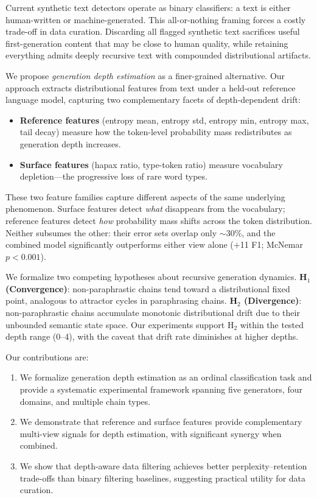 \documentclass[letterpaper,11pt]{article}
\begin{document}
Current synthetic text detectors operate as binary classifiers: a text is either human-written or machine-generated. This all-or-nothing framing forces a costly trade-off in data curation. Discarding all flagged synthetic text sacrifices useful first-generation content that may be close to human quality, while retaining everything admits deeply recursive text with compounded distributional artifacts.

We propose \emph{generation depth estimation} as a finer-grained alternative. Our approach extracts distributional features from text under a held-out reference language model, capturing two complementary facets of depth-dependent drift:
\begin{itemize}
    \item \textbf{Reference features} (entropy mean, entropy std, entropy min, entropy max, tail decay) measure how the token-level probability mass redistributes as generation depth increases.
    \item \textbf{Surface features} (hapax ratio, type-token ratio) measure vocabulary depletion---the progressive loss of rare word types.
\end{itemize}
These two feature families capture different aspects of the same underlying phenomenon. Surface features detect \emph{what} disappears from the vocabulary; reference features detect \emph{how} probability mass shifts across the token distribution. Neither subsumes the other: their error sets overlap only $\sim$30\%, and the combined model significantly outperforms either view alone ($+$11 F1; McNemar $p < 0.001$).

We formalize two competing hypotheses about recursive generation dynamics. \textbf{H$_1$ (Convergence)}: non-paraphrastic chains tend toward a distributional fixed point, analogous to attractor cycles in paraphrasing chains. \textbf{H$_2$ (Divergence)}: non-paraphrastic chains accumulate monotonic distributional drift due to their unbounded semantic state space. Our experiments support H$_2$ within the tested depth range (0--4), with the caveat that drift rate diminishes at higher depths.

Our contributions are:
\begin{enumerate}
    \item We formalize generation depth estimation as an ordinal classification task and provide a systematic experimental framework spanning five generators, four domains, and multiple chain types.
    \item We demonstrate that reference and surface features provide complementary multi-view signals for depth estimation, with significant synergy when combined.
    \item We show that depth-aware data filtering achieves better perplexity--retention trade-offs than binary filtering baselines, suggesting practical utility for data curation.
\end{enumerate}
\end{document}
